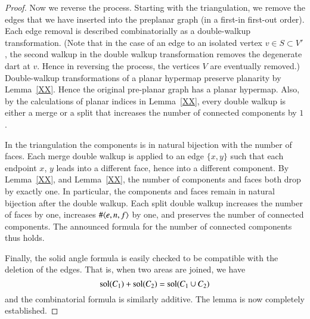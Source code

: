\begin{proof}
Now we reverse the process.  Starting with the triangulation, we remove the
edges that we have inserted into the preplanar graph  (in a first-in first-out order).  
Each edge removal is
described combinatorially as a double-walkup transformation.  (Note that
in the case of an edge to an isolated vertex  $v\in S\subset V'$, the second walkup
in the double walkup
transformation removes the degenerate dart at $v$.  Hence in reversing the process,
the vertices $V$ are eventually removed.)  Double-walkup transformations of
a planar hypermap preserve planarity by Lemma~\ref{XX}.  Hence the original
pre-planar graph has a planar hypermap.  Also, by the calculations of planar indices
in Lemma~\ref{XX}, every double walkup is either a merge or a split that
increases the number of connected components by $1$.

In the triangulation the components is in natural bijection with the number of faces.
Each merge double walkup is applied to an edge $\{x,y\}$ such that each endpoint $x$,
$y$ leads into a different face, hence into a different component.  By Lemma~\ref{XX},
and Lemma~\ref{XX}, the number of components and faces both drop by exactly one.
In particular, the components and faces remain in natural bijection after the
double walkup.  Each split double walkup increases the number of faces by one,
increases $\#\langle e,n,f\rangle$ by one, and preserves the number of connected components.
The announced formula for the number of connected components thus holds.

Finally, the solid angle formula is easily checked to be compatible with
the deletion of the edges.  That is, when two areas are joined, we have
  $${\operatorname{sol}}(C_1) + {\operatorname{sol}}(C_2) = {\operatorname{sol}}(C_1\cup C_2)$$
and the combinatorial formula is similarly additive.
The lemma is now completely established.
\end{proof}



